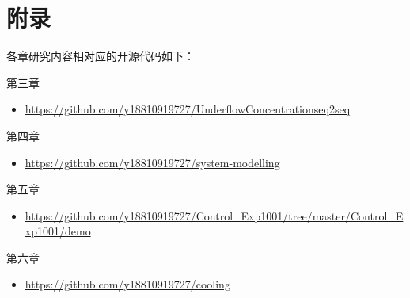 
\chapter*{\centering 附录}
各章研究内容相对应的开源代码如下：

第三章\TitlechapterI

\begin{itemize}
\item \href{https://github.com/y18810919727/UnderflowConcentrationseq2seq}{https://github.com/y18810919727/UnderflowConcentrationseq2seq}
\end{itemize}

第四章\TitlechapterII
\begin{itemize}
\item \href{
    https://github.com/y18810919727/system-modelling}{https://github.com/y18810919727/system-modelling}
\end{itemize}



第五章\TitlechapterIII
\begin{itemize}
    \item \href{https://github.com/y18810919727/Control\_Exp1001/tree/master/Control\_Exp1001/demo}{https://github.com/y18810919727/Control\_Exp1001/tree/master/Control\_Exp1001/demo}
\end{itemize}

第六章\TitlechapterIV


\begin{itemize}
\item \href{https://github.com/y18810919727/cooling}{https://github.com/y18810919727/cooling}
\end{itemize}